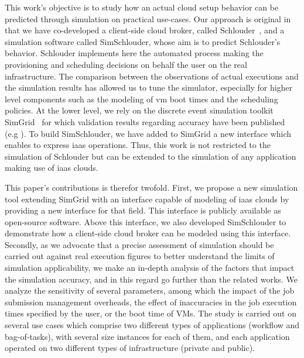 This work's  objective is  to study how  an actual cloud  setup behavior  can be
predicted through simulation on practical use-cases. Our approach is original in
that    we   have    co-developed   a    client-side   cloud    broker,   called
Schlouder~\cite{Michon17}, and a simulation  software called SimSchlouder, whose
aim is to predict Schlouder's behavior.  Schlouder implements here the automated
process making the  provisioning and scheduling decisions on behalf  the user on
the  real infrastructure.  The  comparison between  the  observations of  actual
executions and  the simulation  results has  allowed us  to tune  the simulator,
especially for  higher level  components such  as the  modeling of  \ac{vm} boot
times and the scheduling  policies. At the lower level, we  rely on the discrete
event simulation  toolkit SimGrid~\cite{CasanovaLQ08} for which  validation results
regarding        accuracy         have        been         published        (e.g
\cite{StanisicTLVM15,VelhoSCL13}).  To  build  SimSchlouder, we  have  added  to
SimGrid a  new interface  which enables to  express \ac{iaas}  operations. Thus,
this work is not  restricted to the simulation of Schlouder  but can be extended
to the simulation of any application making use of \ac{iaas} clouds.

This  paper's  contributions  is  therefor  twofold. First,  we  propose  a  new
simulation  tool extending  SimGrid with  an  interface capable  of modeling  of
\ac{iaas} clouds by providing a new  interface for that field. This interface is
publicly  available as  open-source  software.  Above  this  interface, we  also
developed  SimSchlouder to  demonstrate how  a client-side  cloud broker  can be
modeled using this interface.
%
Secondly,  as we  advocate that  a precise  assessment of  simulation should  be
carried out  against real execution figures  to better understand the  limits of
simulation  applicability, we  make an  in-depth  analysis of  the factors  that
impact the simulation  accuracy, and in this regard go  further than the related
works. We analyze the sensitivity of  several parameters, among which the impact
of the  job submission management overheads,  the effect of inaccuracies  in the
job execution times specified  by the user, or the boot time  of VMs.  The study
is  carried out  on several  use  cases which  comprise two  different types  of
applications (workflow and  bag-of-tasks), with several size  instances for each
of them, and each application operated  on two different types of infrastructure
(private and public).


